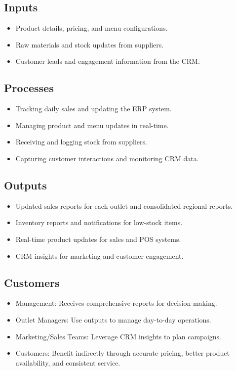 \subsection*{Inputs}
\begin{itemize}
    \item Product details, pricing, and menu configurations.
    \item Raw materials and stock updates from suppliers.
    \item Customer leads and engagement information from the CRM.
\end{itemize}

\subsection*{Processes}
\begin{itemize}
    \item Tracking daily sales and updating the ERP system.
    \item Managing product and menu updates in real-time.
    \item Receiving and logging stock from suppliers.
    \item Capturing customer interactions and monitoring CRM data.
\end{itemize}

\subsection*{Outputs}
\begin{itemize}
    \item Updated sales reports for each outlet and consolidated regional reports.
    \item Inventory reports and notifications for low-stock items.
    \item Real-time product updates for sales and POS systems.
    \item CRM insights for marketing and customer engagement.
\end{itemize}

\subsection*{Customers}
\begin{itemize}
    \item Management: Receives comprehensive reports for decision-making.
    \item Outlet Managers: Use outputs to manage day-to-day operations.
    \item Marketing/Sales Teams: Leverage CRM insights to plan campaigns.
    \item Customers: Benefit indirectly through accurate pricing, better product availability, and consistent service.
\end{itemize}

